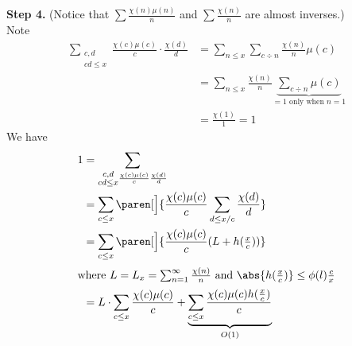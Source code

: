 \textbf{Step 4.} (Notice that $\sum\frac{\chi(n)\mu(n)}{n}$ and $\sum\frac{\chi(n)}{n}$ are almost inverses.) \\
Note
\begin{align*}
\sum_{\substack{c,d\\cd\leq x}}\frac{\chi(c)\mu(c)}{c}\cdot\frac{\chi(d)}{d} &= \sum_{n\leq x}\sum_{c\div n}\frac{\chi(n)}{n}\mu(c) \\
&= \sum_{n\leq x}\frac{\chi(n)}{n}\underbrace{\sum_{c\div n}\mu(c)}_{\text{$=1$ only when $n=1$}} \\
&= \frac{\chi(1)}{1} = 1
\end{align*}
We have
\begin{align*}
1 &= \sum_{\substack{c,d\\cd\leq x}\frac{\chi(c)\mu(c)}{c}\frac{\chi(d)}{d}} \\
&= \sum_{c\leq x}\paren[\Big]{\frac{\chi(c)\mu(c)}{c}\sum_{d\leq x/c}\frac{\chi(d)}{d}} \\
&= \sum_{c\leq x}\paren[\Big]{\frac{\chi(c)\mu(c)}{c}(L+h(\tfrac xc))} \\ \intertext{where $L=L_x=\sum_{n=1}^\infty\frac{\chi(n)}{n}$ and $\abs{h(\tfrac xc)}\leq\phi(l)\tfrac cx$}
&= L\cdot\sum_{c\leq x}\frac{\chi(c)\mu(c)}{c} + \underbrace{\sum_{c\leq x}\frac{\chi(c)\mu(c)h(\frac xc)}{c}}_{O(1)}
\end{align*}
